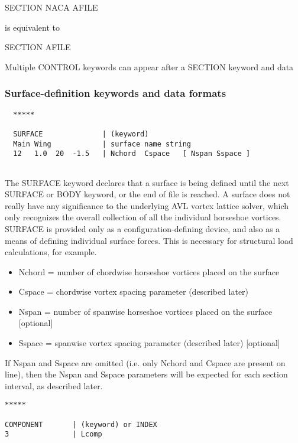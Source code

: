 SECTION
NACA
AFILE

is equivalent to

SECTION
AFILE

Multiple CONTROL keywords can appear after a SECTION keyword and data


\subsubsection{Surface-definition keywords and data formats}
\begin{lstlisting}
  *****
  
  SURFACE              | (keyword)
  Main Wing            | surface name string
  12   1.0  20  -1.5   | Nchord  Cspace   [ Nspan Sspace ]
  
\end{lstlisting}

The SURFACE keyword declares that a surface is being defined until 
the next SURFACE or BODY keyword, or the end of file is reached.  
A surface does not really have any significance to the underlying 
AVL vortex lattice solver, which only recognizes the overall 
collection of all the individual horseshoe vortices.  SURFACE 
is provided only as a configuration-defining device, and also 
as a means of defining individual surface forces.  This is 
necessary for structural load calculations, for example.\\

\begin{itemize}
	\item Nchord =  number of chordwise horseshoe vortices placed on the surface
	\item Cspace =  chordwise vortex spacing parameter (described later)
	
	\item Nspan  =  number of spanwise horseshoe vortices placed on the surface [optional]
	\item Sspace =  spanwise vortex spacing parameter (described later)         [optional]
\end{itemize}


If Nspan and Sspace are omitted (i.e. only Nchord and Cspace are present on line),
then the Nspan and Sspace parameters will be expected for each section interval,
as described later.
\begin{lstlisting}
*****

COMPONENT       | (keyword) or INDEX 
3               | Lcomp

\end{lstlisting}

